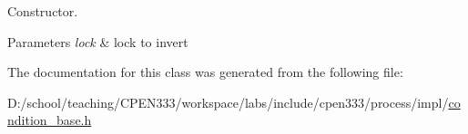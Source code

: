 Constructor. 


\begin{DoxyParams}{Parameters}
{\em lock} & lock to invert \\
\hline
\end{DoxyParams}


The documentation for this class was generated from the following file\+:\begin{DoxyCompactItemize}
\item 
D\+:/school/teaching/\+C\+P\+E\+N333/workspace/labs/include/cpen333/process/impl/\hyperlink{condition__base_8h}{condition\+\_\+base.\+h}\end{DoxyCompactItemize}
